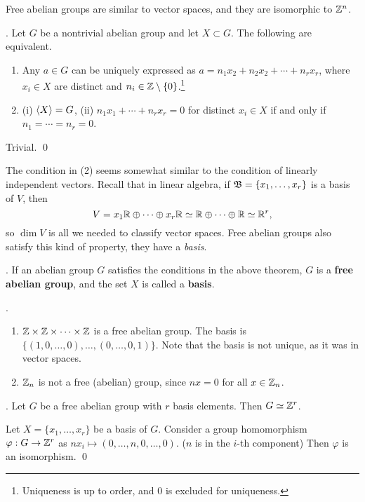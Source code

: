 
Free abelian groups are similar to vector spaces, and they are isomorphic to \(\mathbb{Z}^n\).

\thm. Let \(G\) be a nontrivial abelian group and let \(X \subset G\). The following are equivalent.

\begin{enumerate}
    \item Any \(a \in G\) can be uniquely expressed as \(a = n_1x_2 + n_2x_2 + \cdots + n_rx_r\), where \(x_i \in X\) are distinct and \(n_i \in \mathbb{Z} \setminus \{0\}\).\footnote{Uniqueness is up to order, and 0 is excluded for uniqueness.}
    \item (i) \(\left\langle X \right\rangle = G\), (ii) \(n_1x_1 + \cdots + n_rx_r = 0\) for distinct \(x_i \in X\) if and only if \(n_1 = \cdots = n_r = 0\).
\end{enumerate}

\pf Trivial. \qed

\rmk The condition in (2) seems somewhat similar to the condition of linearly independent vectors. Recall that in linear algebra, if \(\mathfrak{B} = \{x_1, \dots, x_r\}\) is a basis of \(V\), then
\[
    V = x_1\mathbb{R} \oplus \cdots \oplus x_r \mathbb{R} \simeq \mathbb{R} \oplus \cdots \oplus \mathbb{R} \simeq \mathbb{R}^r,
\]
so \(\dim V\) is all we needed to classify vector spaces. Free abelian groups also satisfy this kind of property, they have a \textit{basis}.

.  If an abelian group \(G\) satisfies the conditions in the above theorem, \(G\) is a \textbf{free abelian group}, and the set \(X\) is called a \textbf{basis}.

\ex.
\begin{enumerate}
    \item \(\mathbb{Z} \times \mathbb{Z} \times \cdots \times \mathbb{Z}\) is a free abelian group. The basis is \(\{(1, 0, \dots, 0), \dots, (0, \dots, 0, 1)\}\). Note that the basis is not unique, as it was in vector spaces.
    \item \(\mathbb{Z}_n\) is not a free (abelian) group, since \(nx = 0\) for all \(x \in \mathbb{Z}_n\).
\end{enumerate}

\thm. Let \(G\) be a free abelian group with \(r\) basis elements. Then \(G \simeq \mathbb{Z}^r\).

\pf Let \(X = \{x_1, \dots, x_r\}\) be a basis of \(G\). Consider a group homomorphism \(\varphi : G \rightarrow \mathbb{Z}^r\) as \(nx_i \mapsto (0, \dots, n, 0, \dots, 0)\). (\(n\) is in the \(i\)-th component) Then \(\varphi\) is an isomorphism. \qed


